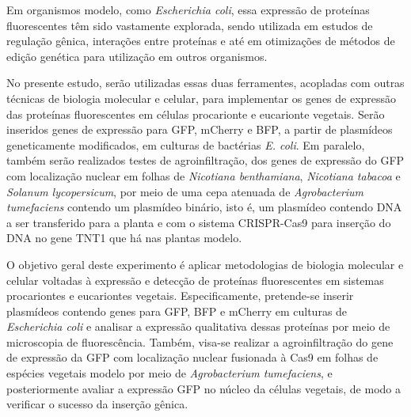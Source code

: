 Em organismos modelo, como \textit{Escherichia coli}, essa expressão de
proteínas fluorescentes têm sido vastamente explorada, sendo utilizada em
estudos de regulação gênica, interações entre proteínas e até em otimizações de
métodos de edição genética para utilização em outros
organismos\cite{ruiz_silhavy_2022}. 

No presente estudo, serão utilizadas essas duas ferramentes, acopladas com
outras técnicas de biologia molecular e celular, para implementar os genes de
expressão das proteínas fluorescentes em células procarionte e eucarionte
vegetais. Serão inseridos genes de expressão para GFP, mCherry e BFP, a partir
de plasmídeos geneticamente modificados, em culturas de bactérias \textit{E.
coli}. Em paralelo, também serão realizados testes de agroinfiltração, dos genes
de expressão do GFP com localização nuclear em folhas de \textit{Nicotiana
benthamiana}, \textit{Nicotiana tabacoa} e \textit{Solanum lycopersicum}, por
meio de uma cepa atenuada de \textit{Agrobacterium tumefaciens} contendo um
plasmídeo binário, isto é, um plasmídeo contendo DNA a ser transferido para a
planta e com o sistema CRISPR-Cas9 para inserção do DNA no gene TNT1 que há nas
plantas modelo\cite{hernández-pinzón_2012}.

O objetivo geral deste experimento é aplicar metodologias de biologia molecular
e celular voltadas à expressão e detecção de proteínas fluorescentes em sistemas
procariontes e eucariontes vegetais. Especificamente, pretende-se inserir
plasmídeos contendo genes para GFP, BFP e mCherry em culturas de
\textit{Escherichia coli}  e analisar a expressão qualitativa dessas proteínas
por meio de microscopia de fluorescência. Também, visa-se realizar a
agroinfiltração do gene de expressão da GFP com localização nuclear fusionada à Cas9 em folhas
de espécies vegetais modelo por meio de \textit{Agrobacterium tumefaciens}, e
posteriormente avaliar a expressão GFP no núcleo da células vegetais, de modo a
verificar o sucesso da inserção gênica. 
